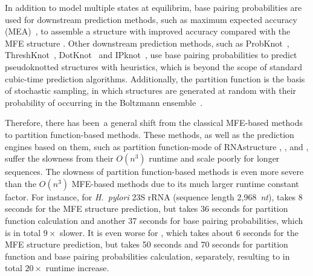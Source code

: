 In addition to model multiple states at equilibrim, 
base pairing probabilities are used for downstream prediction methods, 
such as maximum expected accuracy (MEA)~\cite{Knudsen+Hein:2003, do+:2006}, 
to assemble a structure with improved accuracy compared with the MFE structure \cite{lu+:2009}.
Other downstream prediction methods, 
such as 
ProbKnot~\cite{bellaousov+mathews:2010}, 
ThreshKnot~\cite{Zhang+:2019},
DotKnot~\cite{Sperschneider+Datta:2010} 
and IPknot~\cite{sato+:2011},
use base pairing probabilities to predict pseudoknotted structures with heuristics,
which is beyond the scope of standard cubic-time prediction algorithms.
Additionally, the partition function 
is the basis of stochastic sampling, 
in which structures are generated at random with their probability of occurring in the Boltzmann ensemble~\cite{ding+:2005, mathews:2006}.



Therefore, there has been a general shift from the classical MFE-based methods to partition function-based methods.
These methods, 
as well as the prediction engines based on them, such as partition function-mode of RNAstructure \cite{mathews+turner:2006}, 
\viennarnafold \cite{lorenz+:2011}, 
and \contrafold \cite{do+:2006}, 
suffer the slowness from their $O(n^3)$ runtime and scale poorly for longer sequences. 
The slowness of partition function-based methods is even more severe than the $O(n^3)$ MFE-based methods 
due to its much larger runtime constant factor.
For instance, for 
{\it H.~pylori} 23S rRNA (sequence length 2,968~{\it nt}), \viennarnafold %
takes 8 seconds for the MFE structure prediction, 
but takes 36 seconds for partition function calculation 
and another 37 seconds for base pairing probabilities, 
which is in total $9 \times$ slower.
It is even worse for \contrafold,
which takes about 6 seconds for the MFE structure prediction,
but takes 50 seconds and 70 seconds for partition function and base pairing probabilities calculation, separately,
resulting to in total $20 \times$ runtime increase.

